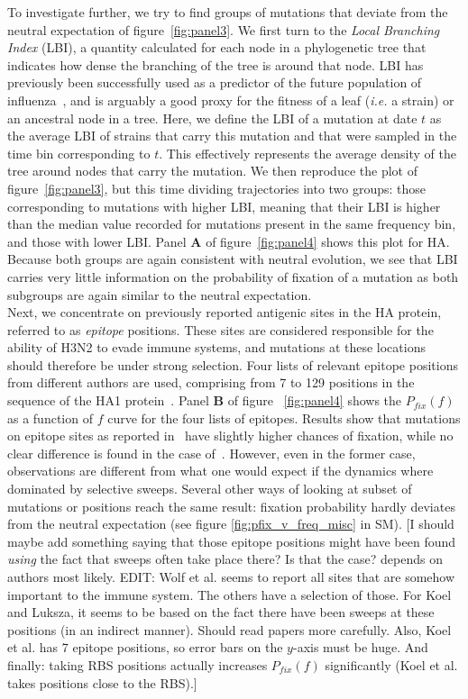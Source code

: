 \documentclass{article}
\begin{document}
	To investigate further, we try to find groups of mutations that deviate from the neutral expectation of figure~\ref{fig:panel3}. We first turn to the \emph{Local Branching Index} (LBI), a quantity calculated for each node in a phylogenetic tree that indicates how dense the branching of the tree is around that node. LBI has previously been successfully used as a predictor of the future population of influenza~\cite{neher_predicting_2014}, and is arguably a good proxy for the fitness of a leaf (\emph{i.e.} a strain) or an ancestral node in a tree. Here, we define the LBI of a mutation at date $t$ as the average LBI of strains that carry this mutation and that were sampled in the time bin corresponding to $t$. This effectively represents the average density of the tree around nodes that carry the mutation. We then reproduce the plot of figure~\ref{fig:panel3}, but this time dividing trajectories into two groups: those corresponding to mutations with higher LBI, meaning that their LBI is higher than the median value recorded for mutations present in the same frequency bin, and those with lower LBI. Panel \textbf{A} of figure~\ref{fig:panel4} shows this plot for HA. Because both groups are again consistent with neutral evolution, we see that LBI carries very little information on the probability of fixation of a mutation as both subgroups are again similar to the neutral expectation. \\
	Next, we concentrate on previously reported antigenic sites in the HA protein, referred to as \emph{epitope} positions. These sites are considered responsible for the ability of H3N2 to evade immune systems, and mutations at these locations should therefore be under strong selection. Four lists of relevant epitope positions from different authors are used, comprising from 7 to 129 positions in the sequence of the HA1 protein~\cite{Koel976, luksza_predictive_2014, Shih6283, wolf_long_2006}. Panel \textbf{B} of figure ~\ref{fig:panel4} shows the $P_{fix}(f)$ as a function of $f$ curve for the four lists of epitopes. Results show that mutations on epitope sites as reported in~\cite{Koel976, luksza_predictive_2014} have slightly higher chances of fixation, while no clear difference is found in the case of~\cite{Shih6283, wolf_long_2006}. However, even in the former case, observations are different from what one would expect if the dynamics where dominated by selective sweeps. Several other ways of looking at subset of mutations or positions reach the same result: fixation probability hardly deviates from the neutral expectation (see figure \ref{fig:pfix_v_freq_misc} in SM). [I should maybe add something saying that those epitope positions might have been found \emph{using} the fact that sweeps often take place there? Is that the case? depends on authors most likely. EDIT: Wolf et al. seems to report all sites that are somehow important to the immune system. The others have a selection of those. For Koel and Luksza, it seems to be based on the fact there have been sweeps at these positions (in an indirect manner). Should read papers more carefully. Also, Koel et al. has 7 epitope positions, so error bars on the $y$-axis must be huge. And finally: taking RBS positions actually increases $P_{fix}(f)$ significantly (Koel et al. takes positions close to the RBS).]\\
\end{document}
